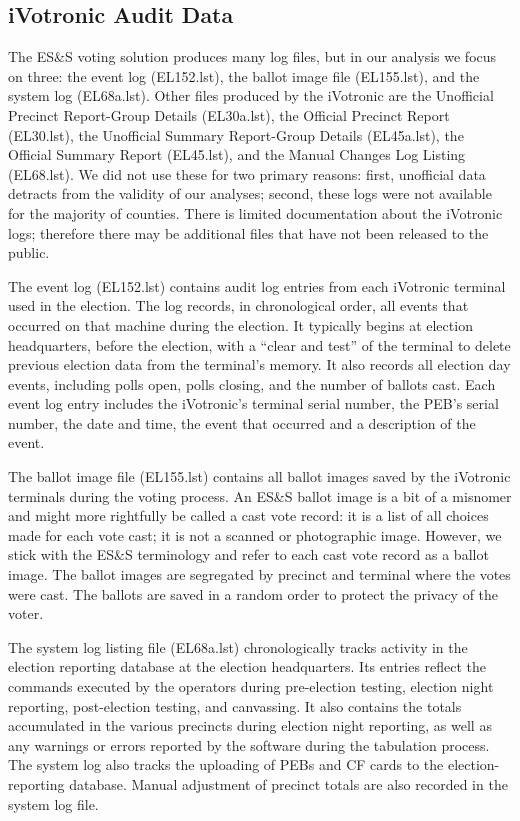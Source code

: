 \documentclass[letterpaper,twocolumn,10pt]{article}
\begin{document}

\subsection{iVotronic Audit Data}
The ES\&S voting solution produces many log files, but in our analysis we focus
on three: the event log (EL152.lst), the ballot image file (EL155.lst), and the
system log (EL68a.lst). Other files produced by the iVotronic are the Unofficial Precinct Report-Group
Details (EL30a.lst), the Official Precinct Report (EL30.lst), the Unofficial Summary 
Report-Group Details (EL45a.lst), the Official Summary Report (EL45.lst), and the 
Manual Changes Log Listing (EL68.lst). We did not use these for two primary reasons: 
first, unofficial data detracts from the validity of our analyses; second, these 
logs were not available for the majority of counties. There is limited documentation 
about the iVotronic logs; therefore there may be additional files 
that have not been released to the public.

The event log (EL152.lst) contains audit
log entries from each iVotronic terminal used in the election. The log records,
in chronological order, all events that occurred on that machine during the
election. It typically begins at election headquarters, before the election, 
with a \textquotedblleft clear and test\textquotedblright \hspace{1 mm} of the 
terminal to delete previous election data from the terminal's memory.  It also 
records all election day events, including polls open, polls closing, and 
the number of ballots cast. Each event log entry includes the iVotronic's 
terminal serial number, the PEB's serial number, the date and time, the event 
that occurred and a description of the event.

The ballot image file (EL155.lst) 
contains all ballot images saved by the iVotronic terminals during the voting
process. An ES\&S ballot image is a bit of a misnomer and might more rightfully
be called a cast vote record: it is a list of all choices made for each vote 
cast; it is not a scanned or photographic image. However, we stick with the
ES\&S terminology and refer to each cast vote record as a ballot image. The ballot images are 
segregated by precinct and terminal where the votes were cast. The ballots are 
saved in a random order to protect the privacy of the voter.

The system log listing file (EL68a.lst) chronologically tracks activity in the
election reporting database at the election headquarters. Its entries reflect 
the commands executed by the operators during pre-election testing, election 
night reporting, post-election testing, and canvassing.  It also contains the totals
accumulated in the various precincts during election night reporting, as well as
any warnings or errors reported by the software during the tabulation
process. The system log also tracks the uploading of PEBs and CF cards to the
election-reporting database. Manual adjustment of precinct totals are also recorded 
in the system log file.
\end{document}
